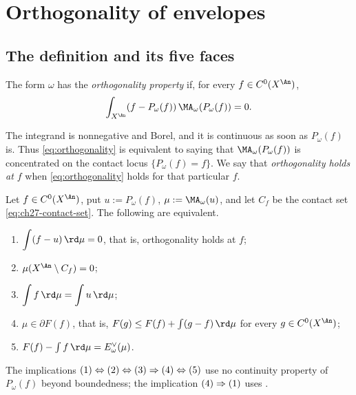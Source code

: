 \section{Orthogonality of envelopes}
\label{sec:ch27-orthogonality}

\subsection{The definition and its five faces}
\label{sec:ch27-orthogonality-definition}

\begin{definition}
\label{def:orthogonality-property}
The form \(\omega\) has the \emph{orthogonality property} if, for every
\(f\in C^0(X^{\An})\),
\begin{equation}\label{eq:orthogonality}
 \int_{X^{\An}}
     (f-P_\omega(f))\,
     \MA_\omega(P_\omega(f))=0.
\end{equation}
\end{definition}

The integrand is nonnegative and Borel, and it is continuous as soon as
\(P_\omega(f)\) is.  Thus \eqref{eq:orthogonality} is equivalent to saying
that \(\MA_\omega(P_\omega(f))\) is concentrated on the contact locus
\(\{P_\omega(f)=f\}\).  We say that \emph{orthogonality holds at \(f\)} when
\eqref{eq:orthogonality} holds for that particular \(f\).

\begin{proposition}
\label{prop:ch27-orthogonality-equivalences}
Let \(f\in C^0(X^{\An})\), put \(u:=P_\omega(f)\),
\(\mu:=\MA_\omega(u)\), and let \(C_f\) be the contact set
\eqref{eq:ch27-contact-set}.  The following are equivalent.
\begin{enumerate}
\item \(\displaystyle\int(f-u)\,\rd\mu=0\), that is, orthogonality holds at
\(f\);
\item \(\mu(X^{\An}\setminus C_f)=0\);
\item \(\displaystyle\int f\,\rd\mu=\int u\,\rd\mu\);
\item \(\mu\in\partial F(f)\), that is,
\(F(g)\leq F(f)+\int(g-f)\,\rd\mu\) for every \(g\in C^0(X^{\An})\);
\item \(F(f)-\int f\,\rd\mu=E^\vee_\omega(\mu)\).
\end{enumerate}
The implications
\(\textup{(1)}\Leftrightarrow\textup{(2)}\Leftrightarrow\textup{(3)}
\Rightarrow\textup{(4)}\Leftrightarrow\textup{(5)}\)
use no continuity property of \(P_\omega(f)\) beyond boundedness; the
implication \(\textup{(4)}\Rightarrow\textup{(1)}\) uses
.
\end{proposition}

